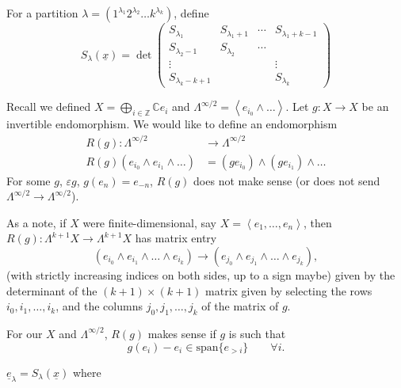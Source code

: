 For a partition
$\lambda=(1^{\lambda_1}2^{\lambda_2}\ldots
k^{\lambda_k})$,
define
$$
S_\lambda(\underline{x})
=\det
\begin{pmatrix}
S_{\lambda_1}& S_{\lambda_1+1}&\cdots &
S_{\lambda_1+k-1}\\
S_{\lambda_2-1}& S_{\lambda_2}&\cdots & \\
\vdots &  &  &  \vdots \\
S_{\lambda_k-k+1}&  &  &  S_{\lambda_k}
\end{pmatrix}
$$

Recall we defined $X=\bigoplus_{i \in
\mathbb{Z}}\mathbb{C}e_i$
and
$\Lambda^{\infty/2}=\left\langle{}e_{i_0}
\wedge\ldots\right\rangle{}$.
Let $g:X \to X$ be an invertible
endomorphism.
We would like to
define an endomorphism
$$
\begin{aligned}
R(g): \Lambda^{\infty/2} &\longrightarrow
\Lambda^{\infty/2} \\
R(g)(e_{i_0}\wedge e_{i_1}\wedge\ldots) &=
(ge_{i_0})\wedge(ge_{i_1})\wedge \ldots
\end{aligned}
$$
For some $g$, $\varepsilon g$,
$g(e_n)=e_{-n}$,
$R(g)$ does not make sense
(or does not send  $\Lambda^{\infty/2}\to
\Lambda^{\infty/2}$).

As a note, if $X$ were finite-dimensional,
say $X=\left\langle{}e_1,\ldots,e_n\right\rangle{}$,
then $R(g):\Lambda^{k+1}X \to \Lambda^{k+1}X$
has matrix entry
$$
(e_{i_0}\wedge e_{i_1}\wedge\ldots\wedge
e_{i_k})
\to(e_{j_0}\wedge e_{j_1} \wedge \ldots
\wedge e_{j_k}),
$$
(with strictly increasing indices on both
sides,
up to a sign maybe)
given by the determinant of the
$(k+1)\times(k+1)$
matrix given by selecting the rows
$i_0,i_1,\ldots,i_k$, and the columns
$j_0,j_1,\ldots,j_k$ of the matrix of $g$.

\medskip\noindent
For our $X$ and $\Lambda^{\infty/2}$,
$R(g)$ makes sense if $g$ is such that
$$
g(e_i)-e_i \in \text{span} \{ e_{>i}\}\qquad
\forall i.
$$

\begin{proposition}
\label{proposition-schur-polynomials}
$\underline{e}_\lambda=
S_\lambda(\underline{x})$
where
\end{proposition}

